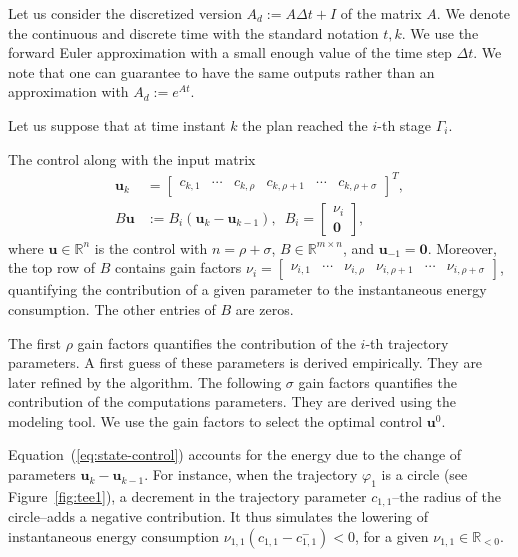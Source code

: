 \documentclass[letterpaper,10pt,conference]{ieeeconf}
\theoremstyle{definition}
\begin{document}
Let us consider the discretized version $A_d:=A\Delta t+I$ of the matrix $A$. We denote the continuous and discrete time with the standard notation $t,k$. We use the forward Euler approximation with a small enough value of the time step $\Delta t$. We note that one can guarantee to have the same outputs rather than an approximation with $A_d:=e^{At}$.

Let us suppose that at time instant $k$ the plan reached the $i$-th stage $\Gamma_i$.

The control along with the input matrix
\begin{equation}\label{eq:state-control}\begin{split}
  \mathbf{u}_k&=\begin{bmatrix}c_{k,1} & \cdots & c_{k,\rho} & c_{k,\rho+1} & \cdots & c_{k,\rho+\sigma}\end{bmatrix}^T,\\
  B\mathbf{u}&:=B_i(\mathbf{u}_k-\mathbf{u}_{k-1}),\,\,\,B_i=\left[\begin{array}{c} \nu_i\\\mathbf{0}\end{array}\right],
\end{split}\end{equation}
where $\mathbf{u}\in\mathbb{R}^n$ is the control with $n=\rho+\sigma$, $B\in\mathbb{R}^{m\times n}$, and $\mathbf{u}_{-1}=\mathbf{0}$. Moreover, the top row of $B$ contains gain factors $\nu_i=\begin{bmatrix}\nu_{i,1} & \cdots & \nu_{i,\rho} & \nu_{i,\rho + 1}& \cdots & \nu_{i,\rho+\sigma}\end{bmatrix}$, quantifying the contribution of a given parameter to the instantaneous energy consumption. The other entries of $B$ are zeros. 

The first $\rho$ gain factors quantifies the contribution of the $i$-th trajectory parameters. A first guess of these parameters is derived empirically. They are later refined by the algorithm. The following $\sigma$ gain factors quantifies the contribution of the computations parameters. They are derived using the modeling tool. We use the gain factors to select the optimal control $\mathbf{u}^0$. 

Equation~(\ref{eq:state-control}) accounts for the energy due to the change of parameters $\mathbf{u}_k-\mathbf{u}_{k-1}$. For instance, when the trajectory $\varphi_1$ is a circle (see Figure~\ref{fig:tee1}), a decrement in the trajectory parameter $c_{1,1}$--the radius of the circle--adds a negative contribution. It thus simulates the lowering of instantaneous energy consumption $\nu_{1,1}(c_{1,1}-c_{1,1}^-)<0$, for a given $\nu_{1,1}\in\mathbb{R}_{<0}$. 
\end{document}
